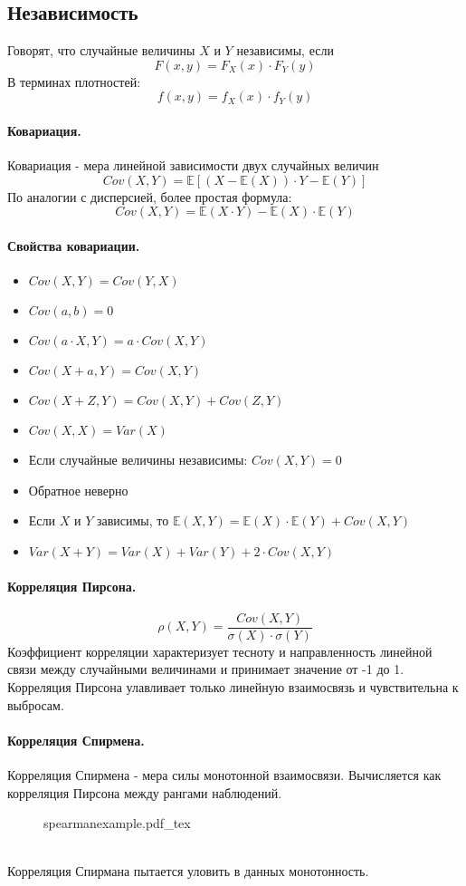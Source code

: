 \documentclass{article}
\newcommand{\E}{\mathbb{E}}
\newcommand{\incfig}[2][1]{%
    \def\svgwidth{#1\columnwidth}
    {#2.pdf_tex}
}
\begin{document}
\subsection{Независимость}
Говорят, что случайные величины $X$ и $Y$ независимы, если
\[
F(x,y)=F_X(x) \cdot F_Y(y)
\]
В терминах плотностей:
\[
f(x,y)=f_X(x) \cdot f_Y(y)
\]
\paragraph{Ковариация.}
Ковариация - мера линейной зависимости двух случайных величин
\[
Cov(X,Y) = \E[(X-\E(X)) \cdot Y-\E(Y)]
\]
По аналогии с дисперсией, более простая формула:
\[
Cov(X,Y) = \E(X \cdot Y) - \E(X) \cdot \E(Y)
\]
\paragraph{Свойства ковариации.}
\begin{itemize}
  \item $Cov(X,Y) = Cov(Y,X)$
  \item $Cov(a,b)=0$
  \item $Cov(a \cdot X,Y) = a \cdot Cov(X,Y)$
  \item $Cov(X+a,Y)=Cov(X,Y)$
  \item $Cov(X+Z,Y) = Cov(X,Y)+Cov(Z,Y)$
  \item $Cov(X,X)=Var(X)$
  \item Если случайные величины независимы: $Cov(X,Y)=0$
  \item Обратное неверно
  \item Если $X$ и $Y$ зависимы, то $\E(X,Y)=\E(X) \cdot \E(Y) + Cov(X,Y)$
  \item $Var(X+Y)=Var(X)+Var(Y) + 2 \cdot Cov(X,Y)$
\end{itemize}
\paragraph{Корреляция Пирсона.}
\[
\rho(X,Y) = \frac{Cov(X,Y)}{\sigma(X) \cdot \sigma(Y)}
\]
Коэффициент корреляции характеризует тесноту и направленность линейной связи между случайными величинами и принимает значение от -1 до 1. Корреляция Пирсона улавливает только линейную взаимосвязь и чувствительна к выбросам.
\newpage
\paragraph{Корреляция Спирмена.}
Корреляция Спирмена - мера силы монотонной взаимосвязи. Вычисляется как корреляция Пирсона между рангами наблюдений.
\begin{figure}[h!]
  \centering
  \incfig{spearmanexample}
\end{figure}
\\
Корреляция Спирмана пытается уловить в данных монотонность.
\end{document}
